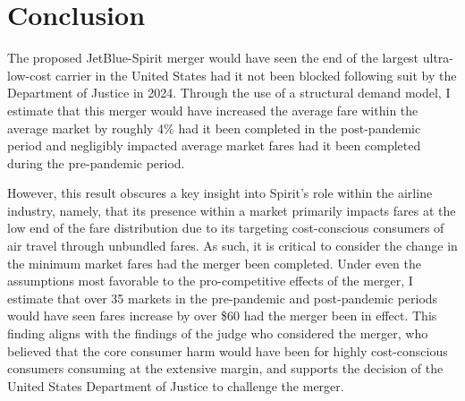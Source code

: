 \documentclass{article}
\begin{document}

    
  

    
	\section{Conclusion}
	\label{sec:Conclusion}
    The proposed JetBlue-Spirit merger would have seen the end of the largest ultra-low-cost carrier in the United States had it not been blocked following suit by the Department of Justice in 2024. Through the use of a structural demand model, I estimate that this merger would have increased the average fare within the average market by roughly 4\% had it been completed in the post-pandemic period and negligibly impacted average market fares had it been completed during the pre-pandemic period.

    However, this result obscures a key insight into Spirit's role within the airline industry, namely, that its presence within a market primarily impacts fares at the low end of the fare distribution due to its targeting cost-conscious consumers of air travel through unbundled fares. As such, it is critical to consider the change in the minimum market fares had the merger been completed. Under even the assumptions most favorable to the pro-competitive effects of the merger, I estimate that over 35 markets in the pre-pandemic and post-pandemic periods would have seen fares increase by over \$60 had the merger been in effect. This finding aligns with the findings of the judge who considered the merger, who believed that the core consumer harm would have been for highly cost-conscious consumers consuming at the extensive margin, and supports the decision of the United States Department of Justice to challenge the merger.
\end{document}
